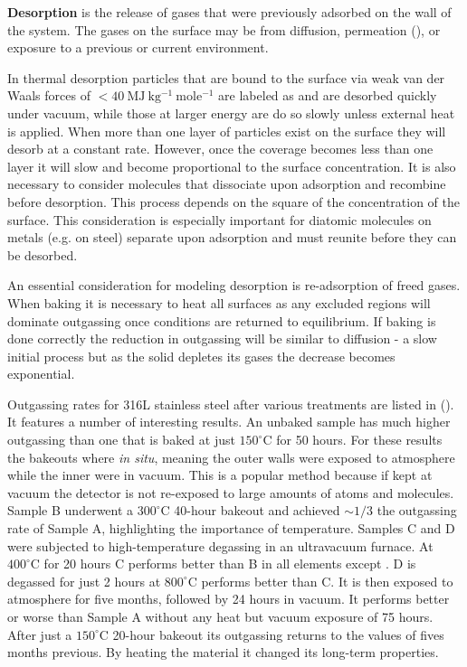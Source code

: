 \textbf{Desorption} is the release of gases that were previously adsorbed on the wall of the system.  The gases on the surface may be from
diffusion, permeation (), or exposure to a previous or current
environment.

In thermal desorption particles that are bound to the surface via weak van der Waals forces of
$< 40\ \mathrm{MJ\ kg^{-1}\ mole^{-1}}$ are labeled
as  and are desorbed quickly under vacuum, while those at larger energy are  do so slowly unless
external heat is applied.  When more than one layer of particles exist on the surface they will desorb at a constant rate.  However, once
the coverage becomes less than one layer it will slow and become proportional to the surface concentration.  It is also necessary to
consider molecules that dissociate upon adsorption and recombine before desorption.  This process depends on the square of the
concentration
of the surface.  This consideration is especially important for diatomic molecules on metals (e.g.  on steel) separate upon
adsorption and must reunite before they can be desorbed.

An essential consideration for modeling desorption is re-adsorption of freed gases.  When baking it is necessary to heat all surfaces as
any excluded regions will dominate outgassing once conditions are returned to equilibrium.  If baking is done correctly the reduction in
outgassing will be similar to diffusion - a slow initial process but as the solid depletes its gases the decrease becomes
exponential.

Outgassing rates for 316L stainless steel after various treatments are listed in
 ().  It features a number of interesting
results.  An unbaked sample has
much higher outgassing than one that is baked at just $150^{\circ}\mathrm{C}$ for 50 hours.  For these results the bakeouts where
\textit{in situ}, meaning the outer walls were exposed to atmosphere while the inner were in vacuum.  This is a popular method because
if kept at vacuum the detector is not re-exposed to large amounts of atoms and molecules.  Sample B underwent a $300^{\circ}\mathrm{C}$
40-hour bakeout and achieved ${\sim} 1/3$ the outgassing rate of Sample A, highlighting the importance of temperature.  Samples C and D
were subjected to high-temperature degassing in an ultravacuum furnace.  At $400^{\circ}\mathrm{C}$ for 20 hours C performs better than B
in all elements except .  D is degassed for just 2 hours at $800^{\circ}\mathrm{C}$ performs better than C.  It is then exposed
to atmosphere for five months, followed by 24 hours in vacuum.  It performs better or worse than Sample A without any heat but vacuum
exposure of 75 hours.  After just a $150^{\circ}\mathrm{C}$ 20-hour bakeout its outgassing returns to the values of fives months
previous.  By heating the material it changed its long-term properties.

